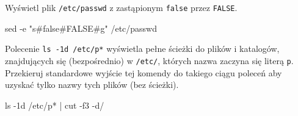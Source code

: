 % 
% 
% 
% 




\dbEntryCheckResults
Wyświetl plik \texttt{/etc/passwd} z zastąpionym \texttt{false} przez \texttt{FALSE}.
\fi
{}\dbEntryCheckResults
\begin{CodeFrame*}[bash]{}
sed -e "s#false#FALSE#g" /etc/passwd
\end{CodeFrame*}
\fi


\dbEntryCheckResults
Polecenie \Verb#ls -1d /etc/p*# wyświetla pełne ścieżki do plików i katalogów, znajdujących się (bezpośrednio) w \texttt{/etc/}, których nazwa zaczyna się literą \texttt{p}.
Przekieruj standardowe wyjście tej komendy do takiego ciągu poleceń aby uzyskać tylko nazwy tych plików (bez ścieżki).
\fi
{}\dbEntryCheckResults
\begin{CodeFrame*}[bash]{}
ls -1d /etc/p* | cut -f3 -d/
\end{CodeFrame*}

